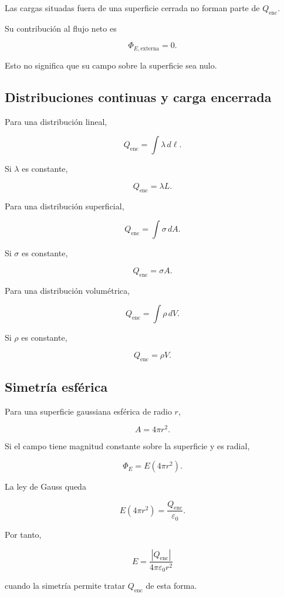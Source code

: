 Las cargas situadas fuera de una superficie cerrada no forman parte de
\(Q_{\text{enc}}\).

Su contribución al flujo neto es

\[
\boxed{
\Phi_{E,\text{externa}}=0
}.
\]

Esto no significa que su campo sobre la superficie sea nulo.


\subsection{Distribuciones continuas y carga encerrada}

Para una distribución lineal,

\[
\boxed{
Q_{\text{enc}}=\int\lambda\,d\ell
}.
\]

Si \(\lambda\) es constante,

\[
\boxed{Q_{\text{enc}}=\lambda L}.
\]

Para una distribución superficial,

\[
\boxed{
Q_{\text{enc}}=\int\sigma\,dA
}.
\]

Si \(\sigma\) es constante,

\[
\boxed{Q_{\text{enc}}=\sigma A}.
\]

Para una distribución volumétrica,

\[
\boxed{
Q_{\text{enc}}=\int\rho\,dV
}.
\]

Si \(\rho\) es constante,

\[
\boxed{Q_{\text{enc}}=\rho V}.
\]


\subsection{Simetría esférica}

Para una superficie gaussiana esférica de radio \(r\),

\[
\boxed{A=4\pi r^2}.
\]

Si el campo tiene magnitud constante sobre la superficie y es radial,

\[
\boxed{\Phi_E=E(4\pi r^2)}.
\]

La ley de Gauss queda

\[
\boxed{
E(4\pi r^2)
=
\frac{Q_{\text{enc}}}{\varepsilon_0}
}.
\]

Por tanto,

\[
\boxed{
E=
\frac{|Q_{\text{enc}}|}
{4\pi\varepsilon_0r^2}
}
\]

cuando la simetría permite tratar \(Q_{\text{enc}}\) de esta forma.


